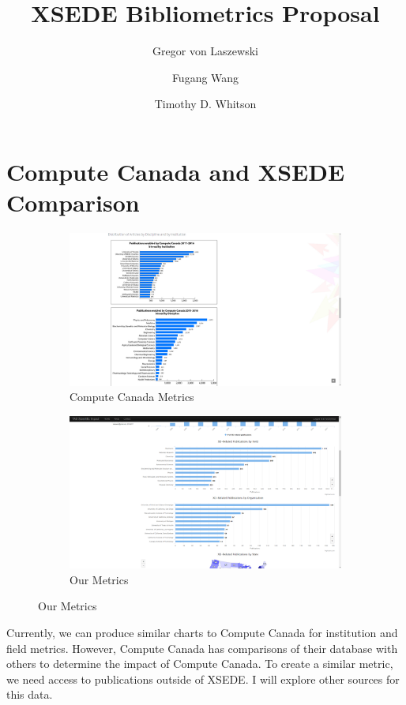 \documentclass[]{article}
\begin{document}
\title{XSEDE Bibliometrics Proposal}
\author{
	Gregor von Laszewski \and
	Fugang Wang \and
	Timothy D. Whitson
}
\maketitle

\section{Compute Canada and XSEDE Comparison}

\begin{figure}[H]
    \centering
    \begin{subfigure}{.5\textwidth}
	    \centering
	    \includegraphics[width=.9\linewidth]{cc.png}
        \caption{Compute Canada Metrics}
        \label{Fig.1}
    \end{subfigure}%
    \begin{subfigure}{.5\textwidth}
	    \centering
	    \includegraphics[width=.9\linewidth]{tas.png}
        \caption{Our Metrics}
        \label{Fig.2}
    \end{subfigure}
\end{figure}

Currently, we can produce similar charts to Compute Canada for institution and field metrics. However, Compute Canada has comparisons of their database with others to determine the impact of Compute Canada. To create a similar metric, we need access to publications outside of XSEDE. I will explore other sources for this data.
\end{document}
